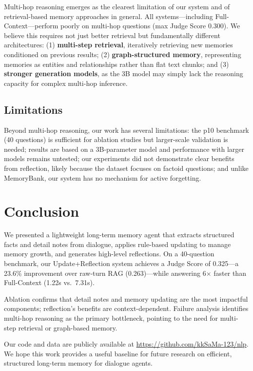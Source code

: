 \documentclass[11pt]{article}
\begin{document}
Multi-hop reasoning emerges as the clearest limitation of our system and of retrieval-based memory approaches in general. All systems---including Full-Context---perform poorly on multi-hop questions (max Judge Score 0.300). We believe this requires not just better retrieval but fundamentally different architectures: (1) \textbf{multi-step retrieval}, iteratively retrieving new memories conditioned on previous results; (2) \textbf{graph-structured memory}, representing memories as entities and relationships rather than flat text chunks; and (3) \textbf{stronger generation models}, as the 3B model may simply lack the reasoning capacity for complex multi-hop inference.

\subsection{Limitations}

Beyond multi-hop reasoning, our work has several limitations: the p10 benchmark (40 questions) is sufficient for ablation studies but larger-scale validation is needed; results are based on a 3B-parameter model and performance with larger models remains untested; our experiments did not demonstrate clear benefits from reflection, likely because the dataset focuses on factoid questions; and unlike MemoryBank, our system has no mechanism for active forgetting.

\section{Conclusion}

We presented a lightweight long-term memory agent that extracts structured facts and detail notes from dialogue, applies rule-based updating to manage memory growth, and generates high-level reflections. On a 40-question benchmark, our Update+Reflection system achieves a Judge Score of 0.325---a 23.6\% improvement over raw-turn RAG (0.263)---while answering 6$\times$ faster than Full-Context (1.22s vs.\ 7.31s).

Ablation confirms that detail notes and memory updating are the most impactful components; reflection's benefits are context-dependent. Failure analysis identifies multi-hop reasoning as the primary bottleneck, pointing to the need for multi-step retrieval or graph-based memory.

Our code and data are publicly available at \url{https://github.com/kkSaMa-123/nlp}. We hope this work provides a useful baseline for future research on efficient, structured long-term memory for dialogue agents.
\end{document}
